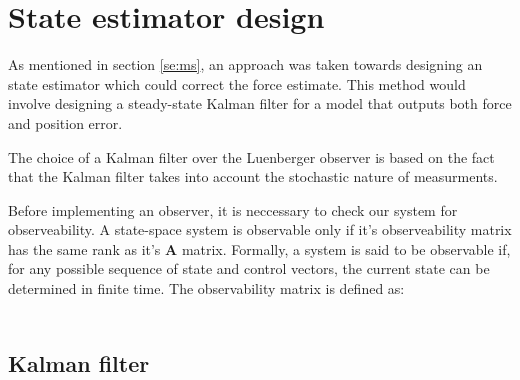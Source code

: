 \section{State estimator design}
As mentioned in section \ref{se:ms}, an approach was taken towards designing an state estimator which could correct the force estimate.
This method would involve designing a steady-state Kalman filter \cite{brown1997introduction} for a model that outputs both force and position error.

The choice of a Kalman filter over the Luenberger observer \cite{friedland2012control} is based on the fact that the Kalman filter takes into account the stochastic nature of measurments.

Before implementing an observer, it is neccessary to check our system for observeability.
A state-space system is observable only if it's observeability matrix has the same rank as it's $\mathbf{A}$ matrix.
Formally, a system is said to be observable if, for any possible sequence of state and control vectors, the current state can be determined in finite time.
The observability matrix is defined as:

\begin{align}

\end{align}



\subsection{Kalman filter }

